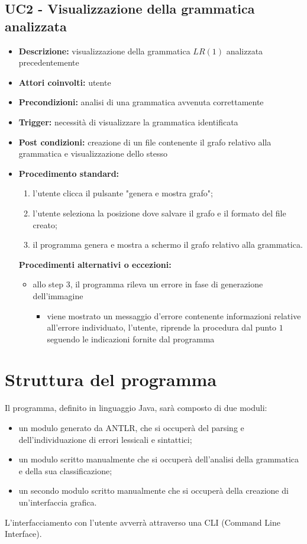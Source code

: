 \documentclass[12pt]{article}
\begin{document}
\subsection{UC2 - Visualizzazione della grammatica analizzata}
\begin{itemize}[label=]
\item \textbf{Descrizione:} visualizzazione della grammatica $LR\left( 1 \right)$ analizzata precedentemente
\item \textbf{Attori coinvolti:} utente
\item \textbf{Precondizioni:} analisi di una grammatica avvenuta correttamente
\item \textbf{Trigger:} necessità di visualizzare la grammatica identificata
\item \textbf{Post condizioni:} creazione di un file contenente il grafo relativo alla grammatica e visualizzazione dello stesso
\item \textbf{Procedimento standard:}
\begin{enumerate}[label=\arabic*.]
\item l'utente clicca il pulsante "genera e mostra grafo";
\item l'utente seleziona la posizione dove salvare il grafo e il formato del file creato;
\item il programma genera e mostra a schermo il grafo relativo alla grammatica.
\end{enumerate}
\textbf{Procedimenti alternativi o eccezioni:}
\begin{itemize}
\item allo step $3$, il programma rileva un errore in fase di generazione dell'immagine
\begin{itemize}[label=]
\item viene mostrato un messaggio d'errore contenente informazioni relative all'errore individuato, l'utente, riprende la procedura dal punto $1$ seguendo le indicazioni fornite dal programma
\end{itemize}
\end{itemize}
\end{itemize}
\pagebreak
\section{Struttura del programma}
Il programma, definito in linguaggio Java, sarà composto di due moduli:
\begin{itemize}
\item un modulo generato da ANTLR, che si occuperà del parsing e dell'individuazione di errori lessicali e sintattici;
\item un modulo scritto manualmente che si occuperà dell'analisi della grammatica e della sua classificazione;
\item un secondo modulo scritto manualmente che si occuperà della creazione di un'interfaccia grafica.
\end{itemize}
L'interfacciamento con l'utente avverrà attraverso una CLI (Command Line Interface).
\pagebreak
\end{document}
